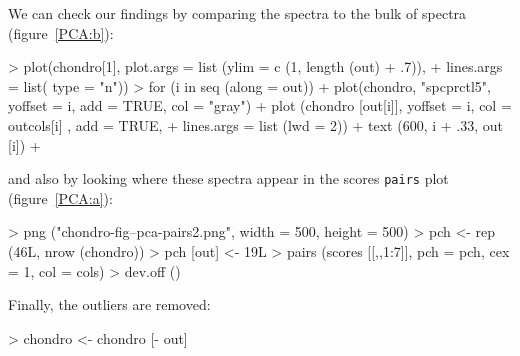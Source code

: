 \documentclass[english, a4paper, 10pt, headings=small, DIV11]{scrartcl}
\renewenvironment{Schunk}{\vspace{0pt}\begin{small}}{\end{small}\vspace{0pt}}
\newcommand{\Rfunction}[2][]{\texorpdfstring{\nohyphens{#1\texttt{#2}}}{#2}}
\begin{document}
We can check our findings by comparing the spectra to the bulk of
spectra (figure~\ref{PCA:b}):

\begin{Schunk}
\begin{Sinput}
> plot(chondro[1], plot.args = list (ylim = c (1, length (out) + .7)),
+ 		 lines.args = list(  type = "n"))
> for (i in seq (along = out)){
+    plot(chondro, "spcprctl5", yoffset = i, add = TRUE, col = "gray")
+    plot (chondro [out[i]], yoffset = i, col = outcols[i] , add = TRUE,
+    			lines.args = list (lwd = 2))
+    text (600, i + .33, out [i])
+ }
\end{Sinput}
\end{Schunk}

and also by looking where these spectra appear in the scores \Rfunction{pairs}
plot (figure~\ref{PCA:a}):

\begin{Schunk}
\begin{Sinput}
> png ("chondro-fig--pca-pairs2.png", width = 500, height = 500)
> pch <- rep (46L, nrow (chondro))
> pch [out] <- 19L
> pairs (scores [[,,1:7]], pch = pch, cex = 1, col = cols)
> dev.off ()
\end{Sinput}
\end{Schunk}

Finally, the outliers are removed:

\begin{Schunk}
\begin{Sinput}
> chondro <- chondro [- out]
\end{Sinput}
\end{Schunk}
\end{document}
